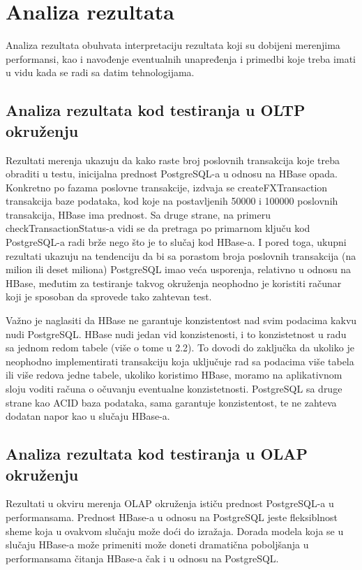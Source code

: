 \documentclass[12pt,oneside]{memoir}
\begin{document}
\chapter{Analiza rezultata}

Analiza rezultata obuhvata interpretaciju rezultata koji su dobijeni merenjima performansi, kao i navođenje eventualnih unapređenja i primedbi koje treba imati u vidu kada se radi sa datim tehnologijama.

\section{Analiza rezultata kod testiranja u OLTP okruženju}

Rezultati merenja ukazuju da kako raste broj poslovnih transakcija koje treba obraditi u testu, inicijalna prednost PostgreSQL-a u odnosu na HBase opada. Konkretno po fazama poslovne transakcije, izdvaja se createFXTransaction transakcija baze podataka, kod koje na postavljenih 50000 i 100000  poslovnih transakcija, HBase ima prednost. Sa druge strane, na primeru checkTransactionStatus-a vidi se da pretraga po primarnom ključu kod PostgreSQL-a radi brže nego što je to slučaj kod HBase-a.  I pored toga, ukupni rezultati ukazuju na tendenciju da bi sa porastom broja poslovnih transakcija (na milion ili deset miliona) PostgreSQL imao veća usporenja, relativno u odnosu na HBase, međutim za testiranje takvog okruženja neophodno je koristiti računar koji je sposoban da sprovede tako zahtevan test.

Važno je naglasiti da HBase ne garantuje konzistentost nad svim podacima kakvu nudi PostgreSQL. HBase nudi jedan vid konzistenosti, i to konzistetnost u radu sa jednom redom tabele (više o tome u 2.2). To dovodi do zaključka da ukoliko je neophodno implementirati transakciju koja uključuje rad sa podacima više tabela ili više redova jedne tabele, ukoliko koristimo HBase, moramo na aplikativnom sloju voditi računa o očuvanju  eventualne konzistetnosti. PostgreSQL sa druge strane kao ACID baza podataka, sama garantuje konzistentost, te ne zahteva dodatan napor kao u slučaju HBase-a. 

\section{Analiza rezultata kod testiranja u OLAP okruženju}

Rezultati u okviru merenja OLAP okruženja ističu prednost PostgreSQL-a u performansama. Prednost HBase-a u odnosu na PostgreSQL jeste fleksiblnost sheme koja u ovakvom slučaju može doći do izražaja. Dorada modela koja se u slučaju HBase-a može primeniti može doneti dramatična poboljšanja u performansama čitanja HBase-a čak i u odnosu na PostgreSQL. 
\end{document}

